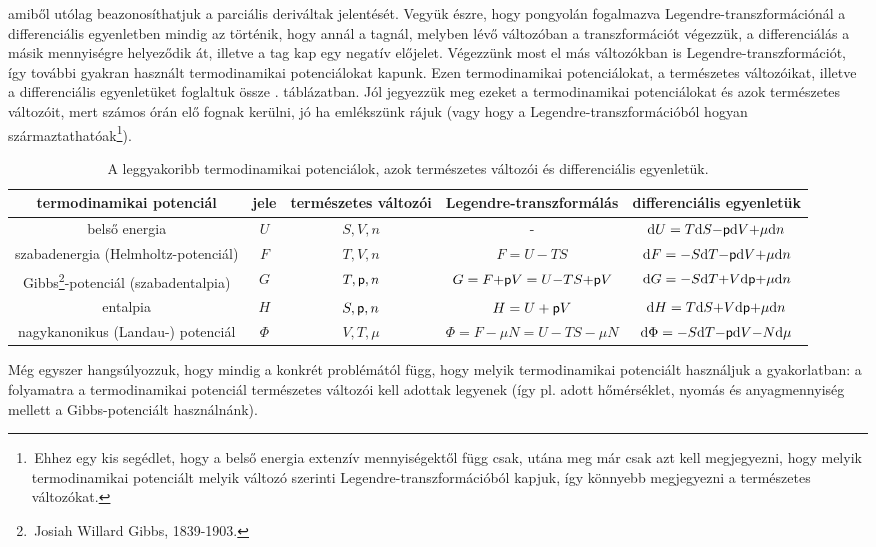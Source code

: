 amiből utólag beazonosíthatjuk a parciális deriváltak jelentését. Vegyük észre, hogy pongyolán fogalmazva Legendre-transzformációnál a differenciális egyenletben mindig az történik, hogy annál a tagnál, melyben lévő változóban a transzformációt végezzük, a differenciálás a másik mennyiségre helyeződik át, illetve a tag kap egy negatív előjelet.
Végezzünk most el más változókban is Legendre-transzformációt, így további gyakran használt termodinamikai potenciálokat kapunk. Ezen termodinamikai potenciálokat, a természetes változóikat, illetve a differenciális egyenletüket foglaltuk össze . táblázatban. Jól jegyezzük meg ezeket a termodinamikai potenciálokat és azok természetes változóit, mert számos órán elő fognak kerülni, jó ha emlékszünk rájuk (vagy hogy a Legendre-transzformációból hogyan származtathatóak\footnote{\,Ehhez egy kis segédlet, hogy a belső energia extenzív mennyiségektől függ csak, utána meg már csak azt kell megjegyezni, hogy melyik termodinamikai potenciált melyik változó szerinti Legendre-transzformációból kapjuk, így könnyebb megjegyezni a természetes változókat.}).

\begin{table}[h!]
\centering
\begin{adjustbox}{width=1.15\textwidth, center=\textwidth}
\begin{tabular}{|c||c|c|c|c|} \hline
termodinamikai potenciál & jele & természetes változói & Legendre-transzformálás & differenciális egyenletük\\ \hline\hline
belső energia & $U$ & $S,V,n$ &  - & $\mathrm{d}U = T\mathrm{d}S{-}\mathsf p \mathrm{d}V {+} \mu\mathrm{d}n$ \\ \hline
szabadenergia (Helmholtz-potenciál) & $F$ & $T,V,n$ & $F = U-TS$ & $\mathrm{d}F = {-}S\mathrm{d}T{-}\mathsf p\mathrm{d}V {+} \mu\mathrm{d}n$\\ \hline
Gibbs\footnote{\,Josiah Willard Gibbs, 1839-1903.}-potenciál (szabadentalpia) & $G$ & $T,\mathsf p,n$ & $G=F{+}\mathsf p V = U{-}TS{+}\mathsf p V$ & $\mathrm{d}G = -S\mathrm{d}T {+}V\mathrm{d}\mathsf p {+}\mu\mathrm{d}n$\\ \hline
entalpia & $H$ & $S,\mathsf p,n$ & $H=U+\mathsf p V$ & $\mathrm{d}H = T\mathrm{d}S {+} V\mathrm{d}\mathsf p {+} \mu \mathrm{d}n$\\ \hline
nagykanonikus (Landau-) potenciál & $\Phi$ & $V,T,\mu$ & $\Phi = F{-}\mu N=U{-}TS{-}\mu N$ & $\mathrm{d}\Phi = {-}S\mathrm{d}T{-}\mathsf p \mathrm{d}V{-}N\mathrm{d}\mu$\\ \hline
\end{tabular}
\end{adjustbox}
\caption{A leggyakoribb termodinamikai potenciálok, azok természetes változói és differenciális egyenletük.}
\label{tab:termo_pot}
\end{table}
Még egyszer hangsúlyozzuk, hogy mindig a konkrét problémától függ, hogy melyik termodinamikai potenciált használjuk a gyakorlatban: a folyamatra a termodinamikai potenciál természetes változói kell adottak legyenek (így pl. adott hőmérséklet, nyomás és anyagmennyiség mellett a Gibbs-potenciált használnánk).
